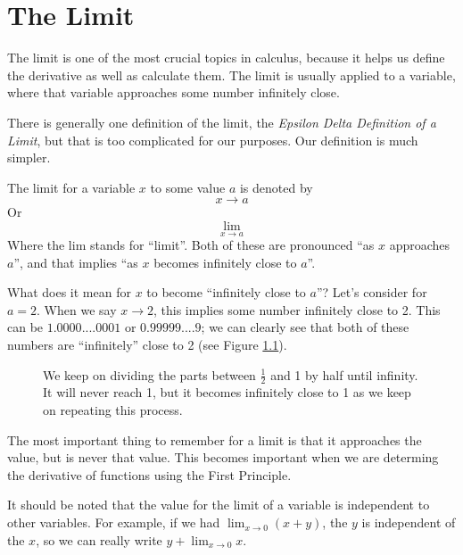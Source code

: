 \documentclass[working]{tuftebook}
\begin{document}
\renewcommand{\thepage}{\arabic{page}}
\pagestyle{plain}
\pagestyle{normal}

\chapter{The Limit}
\vspace{-2em}
The limit is one of the most crucial topics in calculus, because it helps us define the derivative as well as calculate them. The limit is usually applied to a variable, where that variable approaches some number infinitely close.

There is generally one definition of the limit, the \emph{Epsilon Delta Definition of a Limit}, but that is too complicated for our purposes. Our definition is much simpler.

\begin{definition}
    The limit for a variable $x$ to some value $a$ is denoted by 
    \[
        x\to a
    \]
    Or
    \[
        \lim_{x\to a}
    \]
    Where the lim stands for ``limit''. Both of these are pronounced ``as $x$ approaches $a$'', and that implies ``as $x$ becomes infinitely close to $a$''.
\end{definition}

What does it mean for $x$ to become ``infinitely close to $a$''? Let's consider for $a=2$. When we say $x\to 2$, this implies some number infinitely close to 2. This can be $1.0000....0001$ or $0.99999....9$; we can clearly see that both of these numbers are ``infinitely'' close to 2 (see Figure \ref{fig:infinitely-close}).  

\begin{figure}[ht]
    \centering
    \caption{We keep on dividing the parts between $ \frac{1}{2}$ and 1 by half until infinity. It will never reach 1, but it becomes infinitely close to 1 as we keep on repeating this process.}
    \label{fig:infinitely-close}
\end{figure}

The most important thing to remember for a limit is that it approaches the value, but is never that value. This becomes important when we are determing the derivative of functions using the First Principle.

It should be noted that the value for the limit of a variable is independent to other variables. For example, if we had $\displaystyle \lim_{x\to 0}(x+y)$, the $y$ is independent of the $x$, so we can really write $\displaystyle y+\lim_{x\to 0}x$.
\end{document}
